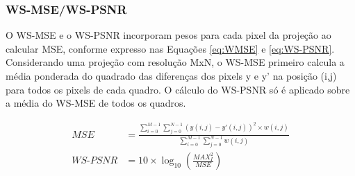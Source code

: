 \begin{figure}[h]
     \centering
     \quad
\end{figure}

\subsubsection{WS-MSE/WS-PSNR}

O WS-MSE e o WS-PSNR incorporam pesos para cada pixel da projeção ao calcular MSE, conforme expresso nas Equações \ref{eq:WMSE} e \ref{eq:WS-PSNR}. Considerando uma projeção com resolução MxN, o WS-MSE primeiro calcula a média ponderada do quadrado das diferenças dos pixels y e y' na posição (i,j) para todos os pixels de cada quadro. O cálculo do WS-PSNR só é aplicado sobre a média do WS-MSE de todos os quadros.

\begin{align}
   \label{eq:WMSE}
    MSE&= \frac{\sum^{M-1}_{i=0}\sum^{N-1}_{j=0} \left(y(i,j) - y'(i,j)\right)^2 \times w(i,j)}{\sum^{M-1}_{i=0} \sum^{N-1}_{j=0} w(i,j)}\\[12pt]
    \label{eq:WS-PSNR}
    WS\mbox{-}PSNR&=10 \times \log_{10}\left(\frac{MAX^2_I}{MSE}\right)
\end{align}

